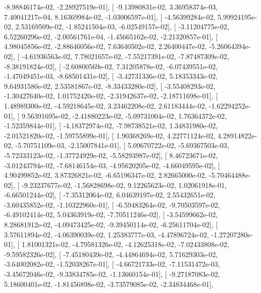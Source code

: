 \documentclass{article}
\begin{document}
         -8.98846174e-02,  -2.28927519e-01],
       [ -9.13980831e-02,   3.36958374e-03,   7.40041217e-04,
          8.16369984e-02,  -1.03006597e-01],
       [ -4.56399284e-02,   5.99924195e-02,   2.53169509e-02,
         -1.85241504e-03,  -6.02549157e-02],
       [ -3.11204775e-02,   6.52260296e-02,  -2.00561761e-04,
         -1.45665162e-02,  -2.21320857e-01],
       [  4.98045856e-02,  -2.88646056e-02,   7.63640502e-02,
          2.26400447e-02,  -5.26064394e-02],
       [ -4.61936563e-02,   7.78021657e-02,  -7.55217391e-02,
         -7.87487309e-02,  -8.38191824e-02],
       [ -2.60800569e-02,   7.31205878e-02,  -6.07439551e-02,
         -1.47049451e-03,  -8.68501431e-02],
       [ -3.42731336e-02,   5.18353343e-02,   9.64931580e-02,
          2.53581867e-02,  -8.33433280e-02],
       [ -3.55408293e-02,  -1.30427640e-02,   1.01752420e-02,
         -2.31942637e-02,  -2.18711698e-01],
       [  1.48989300e-02,  -4.59218645e-02,   3.23462208e-02,
          2.61183444e-02,  -1.62294252e-01],
       [  9.56391695e-02,  -2.41880223e-02,  -5.09731004e-02,
          1.76364372e-02,  -1.52359844e-01],
       [ -4.18372974e-02,  -7.98738521e-02,   1.34831980e-02,
         -2.01521820e-02,  -1.59755899e-01],
       [  1.90368269e-02,   4.22771124e-02,   4.28914822e-02,
         -5.70751109e-03,  -2.15007841e-01],
       [  5.09670722e-02,  -5.69367503e-03,  -5.72333123e-02,
         -1.37724929e-02,  -5.58293987e-02],
       [  8.46723671e-02,  -3.01243794e-02,  -7.68146154e-03,
         -4.95620205e-02,  -4.66049595e-02],
       [  4.90499852e-02,   3.87326821e-02,  -6.65196347e-02,
          2.82665000e-02,  -5.70464488e-02],
       [ -9.23237677e-02,  -1.56828698e-02,   9.12265623e-02,
          1.02061918e-01,  -6.66501244e-02],
       [ -7.35312064e-02,   6.04639197e-02,   2.55432651e-02,
         -3.60435852e-02,  -1.10322960e-01],
       [ -6.59483264e-02,  -9.70503597e-02,  -6.49102414e-02,
          5.04363919e-02,  -7.70511246e-02],
       [ -3.54599662e-02,   8.28681912e-02,  -4.09473425e-02,
         -9.39450114e-02,  -6.25611704e-02],
       [  3.57611894e-02,  -4.06390039e-02,   1.25383777e-03,
         -4.47896724e-02,  -1.27207280e-01],
       [  1.81001321e-02,  -4.79581326e-02,  -4.12625318e-02,
         -7.02433808e-02,  -9.59582326e-02],
       [ -7.45180439e-02,  -4.44864694e-02,   5.71629303e-02,
         -3.64002082e-02,  -1.52038267e-01],
       [ -4.66721733e-02,  -7.11531472e-03,  -3.45672046e-02,
         -9.33834785e-02,  -1.13660154e-01],
       [ -9.27187083e-02,   5.18600401e-02,  -1.81456898e-02,
         -3.73579085e-02,  -2.34834468e-01],
\end{document}

